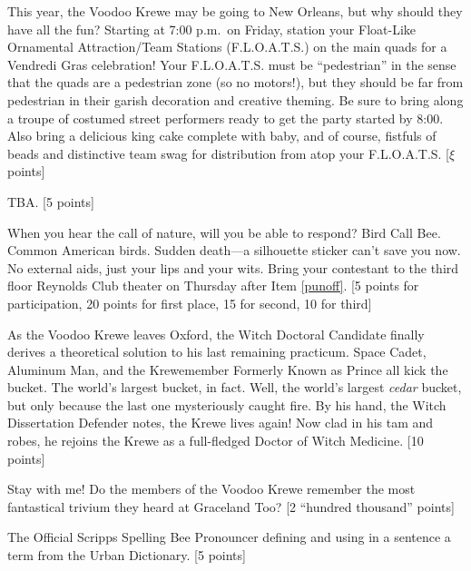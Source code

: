 \documentclass{book}
\begin{document}
\begin{list}{}{}
\item This year, the Voodoo Krewe may be going to New Orleans, but why should they have all the fun? Starting at 7:00 p.m.\ on Friday, station your Float-Like Ornamental Attraction/Team Stations (F.L.O.A.T.S.) on the main quads for a Vendredi Gras celebration! Your F.L.O.A.T.S. must be ``pedestrian'' in the sense that the quads are a pedestrian zone (so no motors!), but they should be far from pedestrian in their garish decoration and creative theming. Be sure to bring along a troupe of costumed street performers ready to get the party started by 8:00. Also bring a delicious king cake complete with baby, and of course, fistfuls of beads and distinctive team swag for distribution from atop your F.L.O.A.T.S. [$\xi$ points] 

\item TBA. [5 points] 

\item \label{birdcall} When you hear the call of nature, will you be able to respond? Bird Call Bee. Common American birds. Sudden death---a silhouette sticker can't save you now. No external aids, just your lips and your wits. Bring your contestant to the third floor Reynolds Club theater on Thursday after Item \ref{punoff}. [5 points for participation, 20 points for first place, 15 for second, 10 for third]

\item As the Voodoo Krewe leaves Oxford, the Witch Doctoral Candidate finally derives a theoretical solution to his last remaining practicum. Space Cadet, Aluminum Man, and the Krewemember Formerly Known as Prince all kick the bucket. The world's largest bucket, in fact. Well, the world's largest \emph{cedar} bucket, but only because the last one mysteriously caught fire. By his hand, the Witch Dissertation Defender notes, the Krewe lives again! Now clad in his tam and robes, he rejoins the Krewe as a full-fledged Doctor of Witch Medicine. [10 points]

\item Stay with me! Do the members of the Voodoo Krewe remember the most fantastical trivium they heard at Graceland Too? [2 ``hundred thousand'' points]


\newpage

\setcounter{page}{14}


\newpage



\item The Official Scripps Spelling Bee Pronouncer defining and using in a sentence a term from the Urban Dictionary. [5 points]


\end{list}
\end{document}
